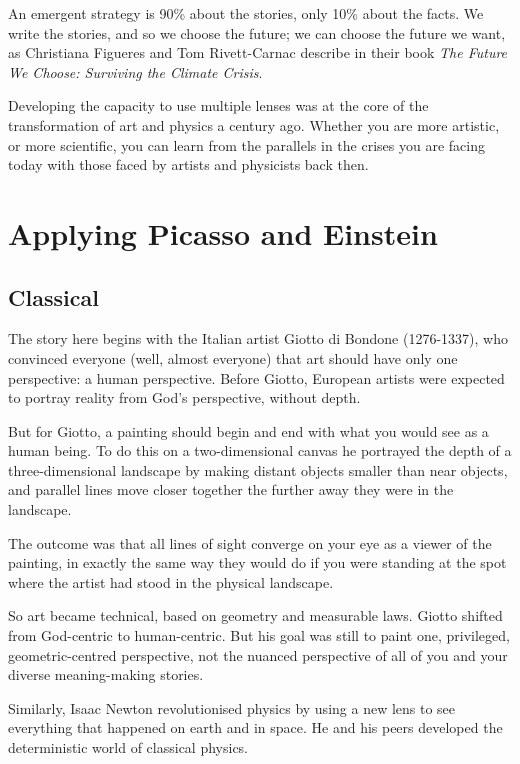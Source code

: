 An emergent strategy is 90\% about the stories, only 10\% about the facts. We write the stories, and so we choose the future; we can choose the future we want, as Christiana Figueres and Tom Rivett-Carnac  describe in their book \emph{The Future We Choose: Surviving the Climate Crisis}\cite{figueres-future}.


Developing the capacity to use multiple lenses was at the core of the transformation of art and physics a century ago. Whether you are more artistic, or more scientific, you can learn from the parallels in the crises you are facing today with those faced by artists and physicists back then.


\section{Applying Picasso and Einstein}
\label{section:applying-picasso-einstein}
\subsection{Classical}
The story here begins with the Italian artist Giotto di Bondone (1276-1337), who convinced everyone (well, almost everyone) that art should have only one perspective: a human perspective. Before Giotto, European artists were expected to portray reality from God's perspective, without depth.


But for Giotto, a painting should begin and end with what you would see as a human being. To do this on a two-dimensional canvas he portrayed the depth of a three-dimensional landscape by making distant objects smaller than near objects, and parallel lines move closer together the further away they were in the landscape. 


The outcome was that all lines of sight converge on your eye as a viewer of the painting, in exactly the same way they would do if you were standing at the spot where the artist had stood in the physical landscape\cite{shlain-art-and-physics}.


So art became technical, based on geometry  and measurable laws. Giotto shifted from God-centric to human-centric. But his goal was still to paint one, privileged, geometric-centred perspective, not the nuanced perspective of all of you and your diverse meaning\hyp{}making stories.


Similarly, Isaac Newton revolutionised physics  by using a new lens  to see everything that happened on earth and in space. He and his peers developed the deterministic world of classical physics. 


